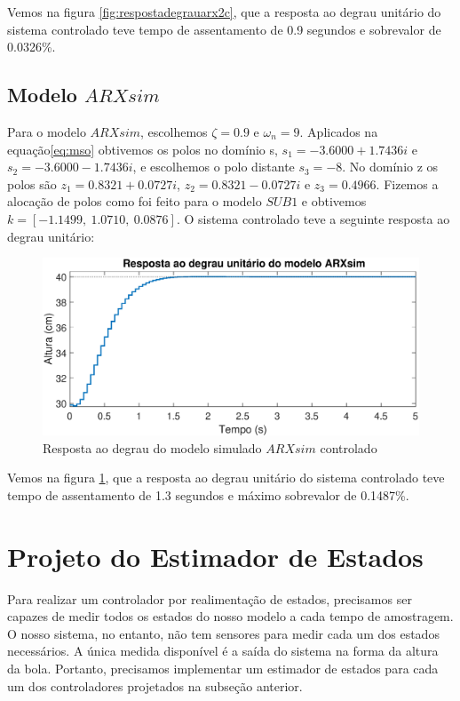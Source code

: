 Vemos na figura \ref{fig:respostadegrauarx2c}, que a resposta ao degrau unitário do sistema controlado teve tempo de assentamento de 0.9 segundos e sobrevalor de 0.0326\%.


\subsection{Modelo $ARXsim$}\label{s:ctrlarxsim}

Para o modelo $ARXsim$, escolhemos $\zeta=0.9$ e $\omega_n=9$. Aplicados na equação\eqref{eq:mso} obtivemos os polos no domínio s, $s_1=-3.6000 + 1.7436i$ e $s_2=-3.6000 - 1.7436i$, e escolhemos o polo distante $s_3=-8$. No domínio z os polos são $z_1=0.8321 + 0.0727i$, $z_2=0.8321 - 0.0727i$ e $z_3=0.4966$. Fizemos a alocação de polos como foi feito para o modelo $SUB1$ e obtivemos $k=[-1.1499,~1.0710,~0.0876]$.
O sistema controlado teve a seguinte resposta ao degrau unitário:

\begin{figure}[H]
	\centering
	\includegraphics[width=1\linewidth]{respostadegrauarxsimc}
	\caption[Resposta ao degrau do modelo simulado $ARXsim$]{Resposta ao degrau do modelo simulado $ARXsim$ controlado}
	\label{fig:respostadegrauarxsimc}
\end{figure}

Vemos na figura \ref{fig:respostadegrauarxsimc}, que a resposta ao degrau unitário do sistema controlado teve tempo de assentamento de 1.3 segundos e máximo sobrevalor de 0.1487\%.


\section{Projeto do Estimador de Estados}\label{s5:est}
Para realizar um controlador por realimentação de estados, precisamos ser capazes de medir todos os estados do nosso modelo a cada tempo de amostragem. O nosso sistema, no entanto, não tem sensores para medir cada um dos estados necessários. A única medida disponível é a saída do sistema na forma da altura da bola. Portanto, precisamos implementar um estimador de estados para cada um dos controladores projetados na subseção anterior.

